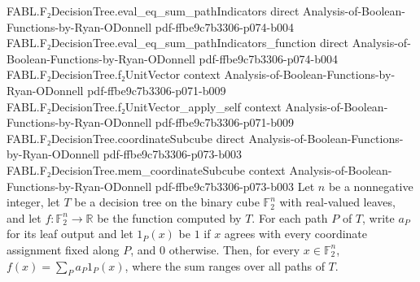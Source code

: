 \begin{theorem}
  {FABL.F₂DecisionTree.eval_eq_sum_pathIndicators}
  {direct}
  {Analysis-of-Boolean-Functions-by-Ryan-ODonnell}
  {pdf-ffbe9c7b3306-p074-b004}
\proofstep
  {FABL.F₂DecisionTree.eval_eq_sum_pathIndicators_function}
  {direct}
  {Analysis-of-Boolean-Functions-by-Ryan-ODonnell}
  {pdf-ffbe9c7b3306-p074-b004}
\proofstep
  {FABL.F₂DecisionTree.f₂UnitVector}
  {context}
  {Analysis-of-Boolean-Functions-by-Ryan-ODonnell}
  {pdf-ffbe9c7b3306-p071-b009}
\proofstep
  {FABL.F₂DecisionTree.f₂UnitVector_apply_self}
  {context}
  {Analysis-of-Boolean-Functions-by-Ryan-ODonnell}
  {pdf-ffbe9c7b3306-p071-b009}
\proofstep
  {FABL.F₂DecisionTree.coordinateSubcube}
  {direct}
  {Analysis-of-Boolean-Functions-by-Ryan-ODonnell}
  {pdf-ffbe9c7b3306-p073-b003}
\proofstep
  {FABL.F₂DecisionTree.mem_coordinateSubcube}
  {context}
  {Analysis-of-Boolean-Functions-by-Ryan-ODonnell}
  {pdf-ffbe9c7b3306-p073-b003}
Let $n$ be a nonnegative integer, let $T$ be a decision tree on the binary cube
$\mathbb{F}_2^n$ with real-valued leaves, and let $f:\mathbb{F}_2^n\to\mathbb{R}$ be
the function computed by $T$. For each path $P$ of $T$, write $a_P$ for its leaf output
and let $1_P(x)$ be $1$ if $x$ agrees with every coordinate assignment fixed along $P$,
and $0$ otherwise. Then, for every $x\in\mathbb{F}_2^n$, $f(x)=\sum_P a_P 1_P(x)$,
where the sum ranges over all paths of $T$.
\end{theorem}

